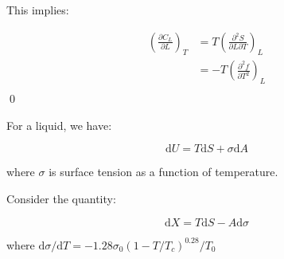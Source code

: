 \documentclass[12pt]{article}
\begin{document}
This implies:

\begin{equation}
\begin{split}
    \left( \frac{\partial C_{L}}{\partial L} \right)_{T} &= T \left( \frac{\partial^{2} S}{\partial L \partial T} \right)_{L} \\
    &= -T \left( \frac{\partial^{2} f}{\partial T^{2}} \right)_{L} \\
\end{split}
\end{equation}
\qed


For a liquid, we have:

\begin{equation}
    \mathrm{d}U = T\mathrm{d}S + \sigma\mathrm{d}A
\end{equation}

where $\sigma$ is surface tension as a function of temperature.

Consider the quantity:

\begin{equation}
    \mathrm{d}X = T\mathrm{d}S - A\mathrm{d}\sigma
\end{equation}

where $\mathrm{d}\sigma/\mathrm{d}T = -1.28\sigma_{0}(1 - T/T_{c})^{0.28}/T_{0}$
\end{document}
